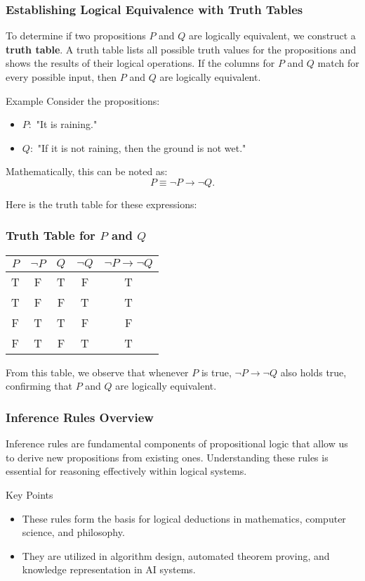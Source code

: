 \documentclass[aspectratio=169]{beamer}
\begin{document}
\begin{frame}[fragile]
    \frametitle{Establishing Logical Equivalence with Truth Tables}
    To determine if two propositions \( P \) and \( Q \) are logically equivalent, we construct a \textbf{truth table}. 
    A truth table lists all possible truth values for the propositions and shows the results of their logical operations. 
    If the columns for \( P \) and \( Q \) match for every possible input, then \( P \) and \( Q \) are logically equivalent.

    \begin{block}{Example}
        Consider the propositions:
        \begin{itemize}
            \item \( P: \) "It is raining."
            \item \( Q: \) "If it is not raining, then the ground is not wet."
        \end{itemize}
        Mathematically, this can be noted as:
        \[ P \equiv \neg P \rightarrow \neg Q. \]

        Here is the truth table for these expressions:
    \end{block}
\end{frame}

\begin{frame}[fragile]
    \frametitle{Truth Table for \( P \) and \( Q \)}
    \begin{tabular}{|c|c|c|c|c|}
        \hline
        \( P \) & \( \neg P \) & \( Q \) & \( \neg Q \) & \( \neg P \rightarrow \neg Q \) \\
        \hline
        T & F & T & F & T \\
        T & F & F & T & T \\
        F & T & T & F & F \\
        F & T & F & T & T \\
        \hline
    \end{tabular}

    From this table, we observe that whenever \( P \) is true, \( \neg P \rightarrow \neg Q \) also holds true, confirming that \( P \) and \( Q \) are logically equivalent. 
\end{frame}

\begin{frame}[fragile]
  \frametitle{Inference Rules Overview}
  Inference rules are fundamental components of propositional logic that allow us to derive new propositions from existing ones. 
  Understanding these rules is essential for reasoning effectively within logical systems.
  
  \begin{block}{Key Points}
    \begin{itemize}
      \item These rules form the basis for logical deductions in mathematics, computer science, and philosophy.
      \item They are utilized in algorithm design, automated theorem proving, and knowledge representation in AI systems.
    \end{itemize}
  \end{block}
\end{frame}
\end{document}
